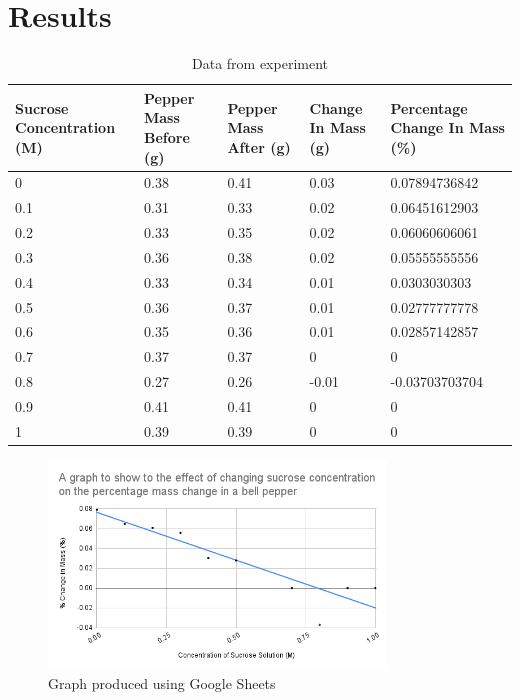 \documentclass{thomasClass}
\begin{document}
\section{Results}
\begin{table}[H]
\centering
\begin{tabularx}{1\textwidth}{X|X|X|X|X}
Sucrose Concentration (M) & Pepper Mass Before (g) & Pepper Mass After (g) & Change In Mass (g) & Percentage Change In Mass (\%) \\
\hline
0 & 0.38 & 0.41 & 0.03 & 0.07894736842 \\
0.1 & 0.31 & 0.33 & 0.02 & 0.06451612903 \\
0.2 & 0.33 & 0.35 & 0.02 & 0.06060606061 \\
0.3 & 0.36 & 0.38 & 0.02 & 0.05555555556 \\
0.4 & 0.33 & 0.34 & 0.01 & 0.0303030303 \\
0.5 & 0.36 & 0.37 & 0.01 & 0.02777777778 \\
0.6 & 0.35 & 0.36 & 0.01 & 0.02857142857 \\
0.7 & 0.37 & 0.37 & 0 & 0 \\
0.8 & 0.27 & 0.26 & -0.01 & -0.03703703704 \\
0.9 & 0.41 & 0.41 & 0 & 0 \\
1 & 0.39 & 0.39 & 0 & 0
\end{tabularx}
\caption{Data from experiment}
\label{tab:data}
\end{table}
\begin{figure}[H]
    \centering
    \includegraphics[width=0.8\textwidth]{graph.png}
    \caption{Graph produced using Google Sheets}
    \label{fig:graph}
\end{figure}
\end{document}

